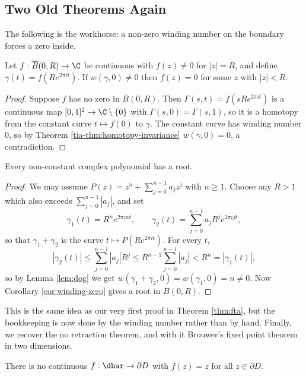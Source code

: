 \subsection{Two Old Theorems Again}

The following is the workhorse: a non-zero winding number on the boundary forces a zero inside.

\begin{corollary}\label{cor:winding-zero}
	Let $f : \overline{B}(0,R)\to\C$ be continuous with $f(z)\neq0$ for $|z|=R$, and define $\gamma(t) = f(Re^{2\pi it})$. If $w(\gamma,0)\neq0$ then $f(z)=0$ for some $z$ with $|z|<R$.
\end{corollary}

\begin{proof}
	Suppose $f$ has no zero in $\overline B(0,R)$. Then $\Gamma(s,t) = f(sRe^{2\pi it})$ is a continuous map $[0,1]^2\to\C\setminus\{0\}$ with $\Gamma(s,0)=\Gamma(s,1)$, so it is a homotopy from the constant curve $t\mapsto f(0)$ to $\gamma$. The constant curve has winding number $0$, so by Theorem \ref{tia-thm:homotopy-invariance} $w(\gamma,0)=0$, a contradiction.
\end{proof}

\begin{theorem}
	Every non-constant complex polynomial has a root.
\end{theorem}

\begin{proof}
	We may assume $P(z) = z^n + \sum_{j=0}^{n-1}a_jz^j$ with $n\geq1$. Choose any $R>1$ which also exceeds $\sum_{j=0}^{n-1}|a_j|$, and set
	$$\gamma_1(t) = R^ne^{2\pi int}, \qquad \gamma_2(t) = \sum_{j=0}^{n-1}a_jR^je^{2\pi ijt},$$
	so that $\gamma_1+\gamma_2$ is the curve $t\mapsto P(Re^{2\pi it})$. For every $t$,
	$$|\gamma_2(t)|\leq\sum_{j=0}^{n-1}|a_j|R^j \leq R^{n-1}\sum_{j=0}^{n-1}|a_j| < R^n = |\gamma_1(t)|,$$
	so by Lemma \ref{lem:dog} we get $w(\gamma_1+\gamma_2,0)=w(\gamma_1,0)=n\neq0$. Now Corollary \ref{cor:winding-zero} gives a root in $B(0,R)$.
\end{proof}

This is the same idea as our very first proof in Theorem \ref{thm:fta}, but the bookkeeping is now done by the winding number rather than by hand. Finally, we recover the no retraction theorem, and with it Brouwer's fixed point theorem in two dimensions.

\begin{theorem}
	There is no continuous $f : \dbar\to\partial D$ with $f(z)=z$ for all $z\in\partial D$.
\end{theorem}

